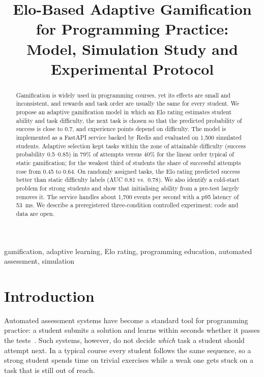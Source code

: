 \documentclass[conference]{IEEEtran}
\begin{document}
\title{Elo-Based Adaptive Gamification for Programming Practice:\\
Model, Simulation Study and Experimental Protocol}

\author{
}

\maketitle

\begin{abstract}
Gamification is widely used in programming courses, yet its effects are small and inconsistent, and rewards and task order are usually the same for every student. We propose an adaptive gamification model in which an Elo rating estimates student ability and task difficulty, the next task is chosen so that the predicted probability of success is close to 0.7, and experience points depend on difficulty. The model is implemented as a FastAPI service backed by Redis and evaluated on 1,500 simulated students. Adaptive selection kept tasks within the zone of attainable difficulty (success probability 0.5--0.85) in 79\% of attempts versus 40\% for the linear order typical of static gamification; for the weakest third of students the share of successful attempts rose from 0.45 to 0.64. On randomly assigned tasks, the Elo rating predicted success better than static difficulty labels (AUC 0.81 vs.\ 0.78). We also identify a cold-start problem for strong students and show that initialising ability from a pre-test largely removes it. The service handles about 1,700 events per second with a p95 latency of 53~ms. We describe a preregistered three-condition controlled experiment; code and data are open.
\end{abstract}

\begin{IEEEkeywords}
gamification, adaptive learning, Elo rating, programming education, automated assessment, simulation
\end{IEEEkeywords}

\section{Introduction}
Automated assessment systems have become a standard tool for programming practice: a student submits a solution and learns within seconds whether it passes the tests~\cite{wasik2018}. Such systems, however, do not decide \emph{which} task a student should attempt next. In a typical course every student follows the same sequence, so a strong student spends time on trivial exercises while a weak one gets stuck on a task that is still out of reach.
\end{document}
